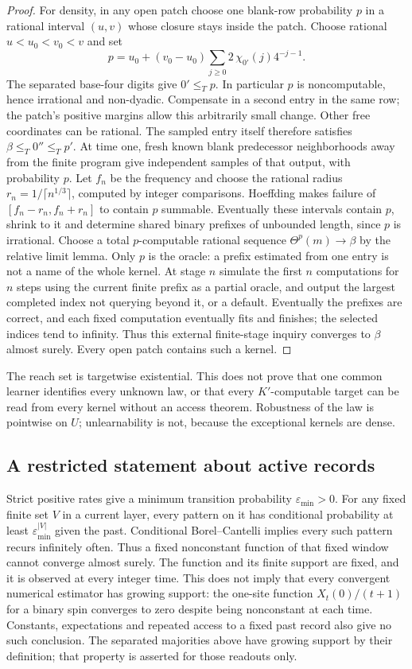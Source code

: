 \begin{proof}
For density, in any open patch choose one blank-row probability $p$
in a rational interval $(u,v)$ whose closure stays inside the patch.
Choose rational $u<u_0<v_0<v$ and set
\[
 p=u_0+(v_0-u_0)\sum_{j\geq0}2\,\chi_{0'}(j)4^{-j-1}.
\]
The separated base-four digits give $0'\leq_Tp$. In particular $p$
is noncomputable, hence irrational and non-dyadic. Compensate in a
second entry in the same row; the patch's positive margins allow
this arbitrarily small change. Other free coordinates can be rational.
The sampled entry itself therefore satisfies
$\beta\leq_T0''\leq_Tp'$. At time one, fresh known blank predecessor
neighborhoods away from the finite program give independent samples
of that output, with probability $p$. Let $f_n$ be the frequency
and choose the rational radius $r_n=1/\lceil n^{1/3}\rceil$,
computed by integer comparisons. Hoeffding makes failure of
$[f_n-r_n,f_n+r_n]$ to contain $p$ summable. Eventually these
intervals contain $p$, shrink to it and determine shared binary
prefixes of unbounded length, since $p$ is irrational.
Choose a total $p$-computable rational sequence
$\Theta^p(m)\to\beta$ by the relative limit lemma. Only $p$ is
the oracle: a prefix estimated from one entry is not a name of the
whole kernel. At stage $n$
simulate the first $n$ computations for $n$ steps using the current
finite prefix as a partial oracle, and output the largest completed
index not querying beyond it, or a default. Eventually the prefixes
are correct, and each fixed computation eventually fits and finishes;
the selected indices tend to infinity. Thus this external finite-stage
inquiry converges to $\beta$ almost surely. Every open patch contains
such a kernel.
\end{proof}
The reach set is targetwise existential. This does not prove that
one common learner identifies every unknown law, or that every
$K'$-computable target can be read from every kernel without an
access theorem. Robustness of the law is pointwise on $U$;
unlearnability is not, because the exceptional kernels are dense.

\subsection{A restricted statement about active records}
Strict positive rates give a minimum transition probability
$\varepsilon_{\min}>0$. For any fixed finite set $V$ in a current
layer, every pattern on it has conditional probability at least
$\varepsilon_{\min}^{|V|}$ given the past. Conditional
Borel--Cantelli implies every such pattern recurs infinitely often.
Thus a fixed nonconstant function of that fixed window cannot
converge almost surely. The function and its finite support are fixed,
and it is observed at every integer time. This does not imply that
every convergent numerical estimator has growing support: the one-site
function $X_t(0)/(t+1)$ for a binary spin converges to zero despite
being nonconstant at each time. Constants, expectations and repeated
access to a fixed past record also give no such conclusion. The
separated majorities above have growing support by their definition;
that property is asserted for those readouts only.
